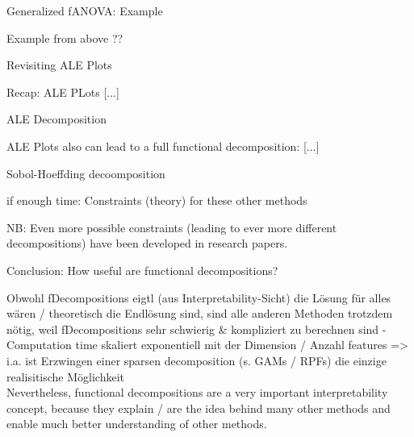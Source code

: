 \documentclass[11pt,compress,t,notes=noshow, aspectratio=169, xcolor=table]{beamer}
\begin{document}
\begin{frame}{Generalized fANOVA: Example}

    Example from above ??
    
\end{frame}

\begin{frame}{Revisiting ALE Plots}

    Recap: ALE PLots [...]
    
\end{frame}

\begin{frame}{ALE Decomposition}
    
    ALE Plots also can lead to a full functional decomposition: [...]
    
\end{frame}

\begin{frame}{Sobol-Hoeffding decoomposition}
    
\end{frame}

\begin{frame}{if enough time: Constraints (theory) for these other methods}

    NB: Even more possible constraints (leading to ever more different decompositions) have been developed in research papers.
    
\end{frame}

\begin{frame}{Conclusion: How useful are functional decompositions?}

    Obwohl fDecompositions eigtl (aus Interpretability-Sicht) die Lösung für alles wären / theoretisch die Endlösung sind, sind alle anderen Methoden trotzdem nötig, weil fDecompositions sehr schwierig \& kompliziert zu berechnen sind
      - Computation time skaliert exponentiell mit der Dimension / Anzahl features  =>  i.a. ist Erzwingen einer sparsen decomposition (s. GAMs / RPFs) die einzige realisitische Möglichkeit \\

    Nevertheless, functional decompositions are a very important interpretability concept, because they explain / are the idea behind many other methods and enable much better understanding of other methods.
    
\end{frame}










\endlecture
\end{document}
